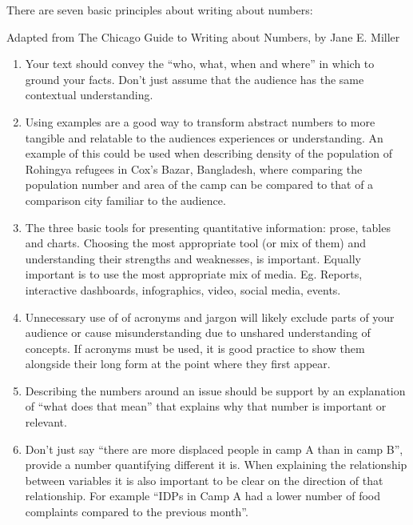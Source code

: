 \documentclass[letterpaper,10pt,english]{jupyterBook}
\begin{document}
\sphinxAtStartPar
There are seven basic principles about writing about numbers: %
\begin{footnote}[1]\sphinxAtStartFootnote
Adapted from The Chicago Guide to Writing about Numbers, by Jane E. Miller
%
\end{footnote}
\begin{enumerate}
%
\item {} 
\sphinxAtStartPar
{}  Your text should convey the “who, what, when and where” in which to ground your facts. Don’t just assume that the audience has the same contextual understanding.

\item {} 
\sphinxAtStartPar
{}  Using examples are a good way to transform abstract numbers to more tangible and relatable to the audiences experiences or understanding. An example of this could be used when describing density of the population of Rohingya refugees in Cox’s Bazar, Bangladesh, where comparing the population number and area of the camp can be compared to that of a comparison city familiar to the audience.

\item {} 
\sphinxAtStartPar
{} The three basic tools for presenting quantitative information: prose, tables and charts. Choosing the most appropriate tool (or mix of them) and understanding their strengths and weaknesses, is important. Equally important is to use the most appropriate mix of media. Eg. Reports, interactive dashboards, infographics, video, social media, events.

\item {} 
\sphinxAtStartPar
{} Unnecessary use of of acronyms and jargon will likely exclude parts of your audience or cause misunderstanding due to unshared understanding of concepts. If acronyms must be used, it is good practice to show them alongside their long form at the point where they first appear.

\item {} 
\sphinxAtStartPar
{}  Describing the numbers around an issue should be support by an explanation of “what does that mean” that explains why that number is important or relevant.

\item {} 
\sphinxAtStartPar
{}  Don’t just say “there are more displaced people in camp A than in camp B”, provide a number quantifying  different it is. When explaining the relationship between variables it is also important to be clear on the direction of that relationship. For example “IDPs in Camp A had a lower number of food complaints compared to the previous month”.


\end{enumerate}
\end{document}

